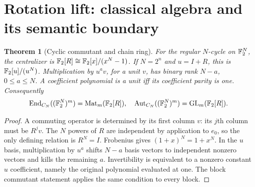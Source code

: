 \documentclass[11pt]{article}
\newtheorem{theorem}{Theorem}[section]
\theoremstyle{remark}
\begin{document}
\section{Rotation lift: classical algebra and its semantic boundary}
\label{sec:rotation}
\begin{theorem}[Cyclic commutant and chain ring]
For the regular $N$-cycle on $\mathbb F_2^N$, the centralizer is
$\mathbb F_2[R]\cong\mathbb F_2[x]/(x^N-1)$. If $N=2^n$ and $u=I+R$, this is
$\mathbb F_2[u]/(u^N)$. Multiplication by $u^a v$, for a unit $v$, has binary rank
$N-a$, $0\leq a\leq N$. A coefficient polynomial is a unit iff its coefficient
parity is one. Consequently
\[
 \operatorname{End}_{C_N}((\mathbb F_2^N)^m)=\operatorname{Mat}_m(\mathbb F_2[R]),\quad
 \operatorname{Aut}_{C_N}((\mathbb F_2^N)^m)=\operatorname{GL}_m(\mathbb F_2[R]).
\]
\end{theorem}
\begin{proof}
A commuting operator is determined by its first column $v$: its $j$th column
must be $R^jv$. The $N$ powers of $R$ are independent by application to $e_0$,
so the only defining relation is $R^N=I$. Frobenius gives
$(1+x)^N=1+x^N$. In the $u$ basis, multiplication by $u^a$ shifts $N-a$ basis
vectors to independent nonzero vectors and kills the remaining $a$.
Invertibility is equivalent to a nonzero constant $u$ coefficient, namely the
original polynomial evaluated at one. The block commutant statement applies
the same condition to every block.
\end{proof}
\end{document}
